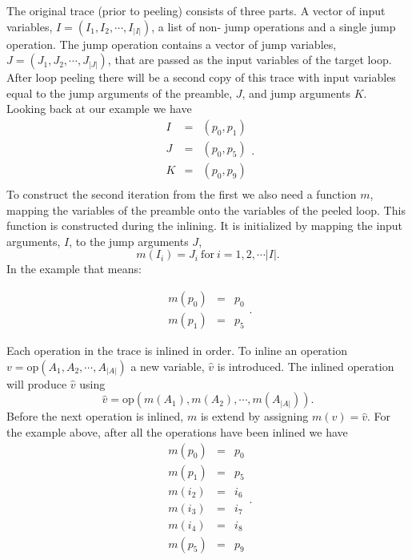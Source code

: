 \documentclass[preprint]{sigplanconf}
\begin{document}
The original trace (prior to peeling) consists of three parts.
A vector of input
variables, $I=\left(I_1, I_2, \cdots, I_{|I|}\right)$, a list of non-
jump operations and a single
jump operation. The jump operation contains a vector of jump variables,
$J=\left(J_1, J_2, \cdots, J_{|J|}\right)$, that are passed as the input variables of the target loop. After
loop peeling there will be a second copy of this trace with input
variables equal to the jump arguments of the preamble, $J$, and jump
arguments $K$. Looking back at our example we have
\begin{equation}
    \begin{array}{lcl}
      I &=& \left( p_0, p_1 \right) \\
      J &=& \left( p_0, p_5 \right) \\
      K &=& \left( p_0, p_9 \right) \\
    \end{array}
  .
\end{equation}
To construct the second iteration from the first we also need a
function $m$, mapping the variables of the preamble onto the
variables of the peeled loop. This function is constructed during the
inlining. It is initialized by mapping the input arguments, $I$, to
the jump arguments $J$,
\begin{equation}
  m\left(I_i\right) = J_i \ \text{for}\ i = 1, 2, \cdots |I| .
\end{equation}
In the example that means:

\begin{equation}
    \begin{array}{lcl}
      m\left(p_0\right) &=& p_0 \\
      m\left(p_1\right) &=& p_5
    \end{array}
  .
\end{equation}

Each operation in the trace is inlined in order.
To inline an operation $v=\text{op}\left(A_1, A_2, \cdots, A_{|A|}\right)$
a new variable, $\hat v$ is introduced. The inlined operation will
produce $\hat v$ using
\begin{equation}
  \hat v = \text{op}\left(m\left(A_1\right), m\left(A_2\right), 
    \cdots, m\left(A_{|A|}\right)\right) . 
\end{equation}
Before the
next operation is inlined, $m$ is extend by assigning $m\left(v\right) = \hat
v$. For the example above, after all the operations have been inlined we have
\begin{equation}
    \begin{array}{lcl}
      m\left(p_0\right) &=& p_0 \\
      m\left(p_1\right) &=& p_5 \\
      m\left(i_2\right) &=& i_6 \\
      m\left(i_3\right) &=& i_7 \\
      m\left(i_4\right) &=& i_8 \\
      m\left(p_5\right) &=& p_9 \\
    \end{array}
  .
\end{equation}
\end{document}
